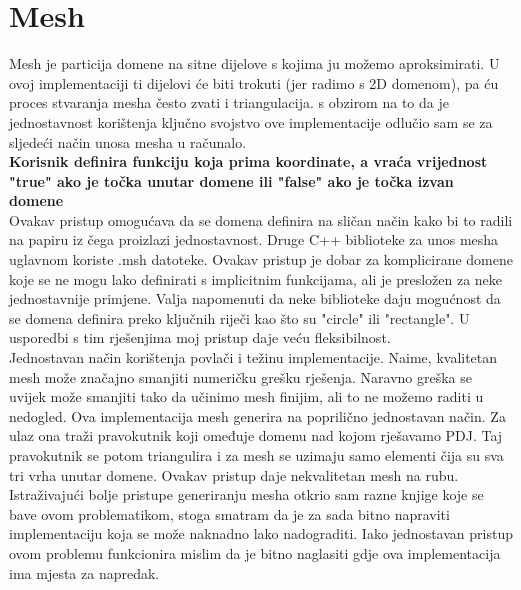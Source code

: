 \documentclass[zavrsnirad]{../fer}
\begin{document}
\section{Mesh}
\label{mesh}
Mesh je particija domene na sitne dijelove s kojima ju
možemo aproksimirati. U ovoj implementaciji ti dijelovi 
će biti trokuti (jer radimo s 2D domenom), pa ću proces
stvaranja mesha često zvati i triangulacija. s obzirom na to da
je jednostavnost korištenja ključno svojstvo ove implementacije 
odlučio sam se za sljedeći način unosa mesha u računalo.
\bigskip
\\ 
\textbf{Korisnik definira funkciju koja prima koordinate, a
vraća vrijednost "true" ako je točka unutar domene ili
"false" ako je točka izvan domene}
\bigskip
\\ 
Ovakav pristup omogućava da se domena definira na sličan 
način kako bi to radili na papiru iz čega proizlazi jednostavnost.
Druge C++ biblioteke za unos mesha uglavnom koriste .msh datoteke.
Ovakav pristup je dobar za komplicirane domene koje se ne mogu
lako definirati s implicitnim funkcijama, ali je presložen za neke
jednostavnije primjene. Valja napomenuti da neke biblioteke 
daju mogućnost da se domena definira preko ključnih riječi kao 
što su "circle" ili "rectangle". U usporedbi s tim rješenjima 
moj pristup daje veću fleksibilnost.
\bigskip
\\ 
Jednostavan način korištenja povlači i težinu implementacije.
Naime, kvalitetan mesh može značajno smanjiti numeričku grešku
rješenja. Naravno greška se uvijek može smanjiti tako da 
učinimo mesh finijim, ali to ne možemo raditi u nedogled.
Ova implementacija mesh generira na poprilično jednostavan način.
Za ulaz ona traži pravokutnik koji omeđuje domenu nad kojom
rješavamo PDJ. Taj pravokutnik se potom triangulira i za mesh
se uzimaju samo elementi čija su sva tri vrha unutar domene.
Ovakav pristup daje nekvalitetan mesh na rubu. Istraživajući
bolje pristupe generiranju mesha otkrio sam razne knjige koje
se bave ovom problematikom, stoga smatram da je za sada
bitno napraviti implementaciju koja se može naknadno lako 
nadograditi. Iako jednostavan pristup ovom problemu funkcionira
mislim da je bitno naglasiti gdje ova implementacija ima
mjesta za napredak.
\end{document}
